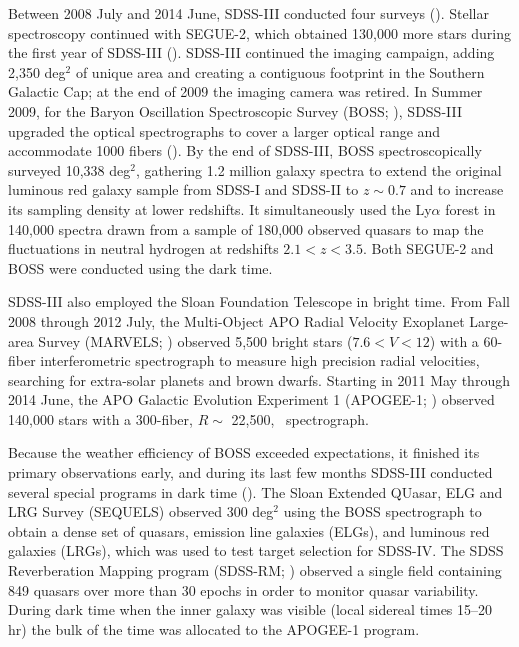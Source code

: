 Between 2008 July and 2014 June, SDSS-III conducted four surveys
(\citealt{eisenstein11a}). Stellar spectroscopy continued with
SEGUE-2, which obtained 130,000 more stars during the first year of
SDSS-III (\citealt{aihara11a}). SDSS-III continued the imaging
campaign, adding 2,350 deg$^2$ of unique area and creating a
contiguous footprint in the Southern Galactic Cap; at the end of 2009
the imaging camera was retired. In Summer 2009, for the Baryon
Oscillation Spectroscopic Survey (BOSS; \citealt{dawson13a}), SDSS-III
upgraded the optical spectrographs to cover a larger optical range and
accommodate 1000 fibers (\citealt{smee13a}). By the end of SDSS-III,
BOSS spectroscopically surveyed 10,338 deg$^{2}$, gathering 1.2
million galaxy spectra to extend the original luminous red galaxy
sample from SDSS-I and SDSS-II to $z\sim 0.7$ and to increase its
sampling density at lower redshifts. It simultaneously used the
Ly$\alpha$ forest in 140,000 spectra drawn from a sample of 180,000
observed quasars to map the fluctuations in neutral hydrogen at
redshifts $2.1<z<3.5$. Both SEGUE-2 and BOSS were conducted using the
dark time.

SDSS-III also employed the Sloan Foundation Telescope in bright
time. From Fall 2008 through 2012 July, the Multi-Object APO Radial
Velocity Exoplanet Large-area Survey (MARVELS; \citealt{ge09a})
observed 5,500 bright stars ($7.6<V<12$) with a 60-fiber
interferometric spectrograph to measure high precision radial
velocities, searching for extra-solar planets and brown
dwarfs. Starting in 2011 May through 2014 June, the APO Galactic
Evolution Experiment 1 (APOGEE-1; \citealt{majewski15a}) observed
140,000 stars with a 300-fiber, $R\sim$ 22,500, \Hband\ spectrograph.

Because the weather efficiency of BOSS exceeded expectations, it
finished its primary observations early, and during its last few
months SDSS-III conducted several special programs in dark time
(\citealt{alam15b}). The Sloan Extended QUasar, ELG and LRG Survey
(SEQUELS) observed 300 deg$^2$ using the BOSS spectrograph to obtain a
dense set of quasars, emission line galaxies (ELGs), and luminous red
galaxies (LRGs), which was used to test target selection for
SDSS-IV. The SDSS Reverberation Mapping program
(SDSS-RM; \citealt{shen15a}) observed a single field containing 849
quasars over more than 30 epochs in order to monitor quasar
variability. During dark time when the inner galaxy was visible (local
sidereal times 15--20 hr) the bulk of the time was allocated to the
APOGEE-1 program.

